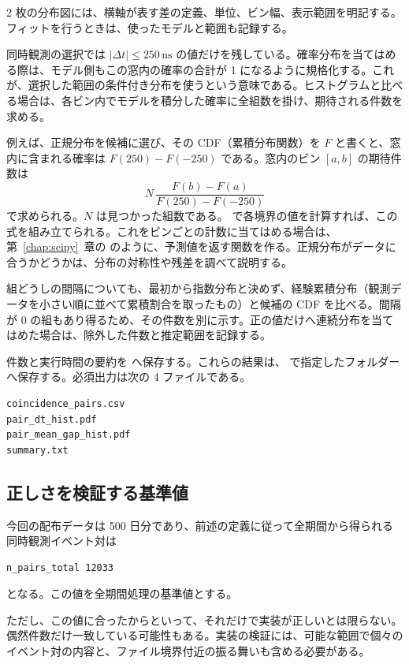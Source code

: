 2 枚の分布図には、横軸が表す差の定義、単位、ビン幅、表示範囲を明記する。フィットを行うときは、使ったモデルと範囲も記録する。

同時観測の選択では \(\lvert\Delta t\rvert\leq250\,\mathrm{ns}\) の値だけを残している。確率分布を当てはめる際は、モデル側もこの窓内の確率の合計が 1 になるように規格化する。これが、選択した範囲の条件付き分布を使うという意味である。ヒストグラムと比べる場合は、各ビン内でモデルを積分した確率に全組数を掛け、期待される件数を求める。

例えば、正規分布を候補に選び、その CDF（累積分布関数）を \(F\) と書くと、窓内に含まれる確率は \(F(250)-F(-250)\) である。窓内のビン \([a,b]\) の期待件数は
\[
N\,\frac{F(b)-F(a)}{F(250)-F(-250)}
\]
で求められる。\(N\) は見つかった組数である。 で各境界の値を計算すれば、この式を組み立てられる。これをビンごとの計数に当てはめる場合は、第~\ref{chap:scipy}~章の  のように、予測値を返す関数を作る。正規分布がデータに合うかどうかは、分布の対称性や残差を調べて説明する。

組どうしの間隔についても、最初から指数分布と決めず、経験累積分布（観測データを小さい順に並べて累積割合を取ったもの）と候補の CDF を比べる。間隔が 0 の組もあり得るため、その件数を別に示す。正の値だけへ連続分布を当てはめた場合は、除外した件数と推定範囲を記録する。

件数と実行時間の要約を  へ保存する。これらの結果は、 で指定したフォルダーへ保存する。必須出力は次の 4 ファイルである。

\begin{lstlisting}[numbers=none, xleftmargin=2\zw]
coincidence_pairs.csv
pair_dt_hist.pdf
pair_mean_gap_hist.pdf
summary.txt
\end{lstlisting}

\subsection{正しさを検証する基準値}

今回の配布データは 500 日分であり、前述の定義に従って全期間から得られる同時観測イベント対は

\begin{lstlisting}[numbers=none, xleftmargin=2\zw]
n_pairs_total 12033
\end{lstlisting}

となる。この値を全期間処理の基準値とする。

ただし、この値に合ったからといって、それだけで実装が正しいとは限らない。偶然件数だけ一致している可能性もある。実装の検証には、可能な範囲で個々のイベント対の内容と、ファイル境界付近の振る舞いも含める必要がある。

